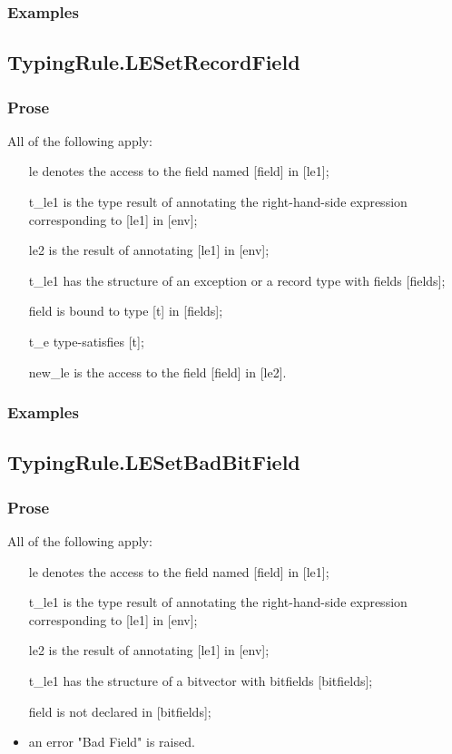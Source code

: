 \documentclass{book}
\begin{document}
    \subsubsection{Examples}

\subsection{TypingRule.LESetRecordField}

    \subsubsection{Prose}
    All of the following apply:
   \begin{itemize}
   \item [le] denotes the access to the field named [field] in [le1];
   \item [t\_le1] is the type result of annotating the right-hand-side expression corresponding to [le1] in [env];
   \item [le2] is the result of annotating [le1] in [env];
   \item [t\_le1] has the structure of an exception or a record type with fields [fields];
   \item [field] is bound to type [t] in [fields];
   \item [t\_e] type-satisfies [t]; 
   \item [new\_le] is the access to the field [field] in [le2].
   \end{itemize}

    \subsubsection{Examples}

\subsection{TypingRule.LESetBadBitField}

    \subsubsection{Prose}
    All of the following apply:
   \begin{itemize}
   \item [le] denotes the access to the field named [field] in [le1];
   \item [t\_le1] is the type result of annotating the right-hand-side expression corresponding to [le1] in [env];
   \item [le2] is the result of annotating [le1] in [env];
   \item [t\_le1] has the structure of a bitvector with bitfields [bitfields];
   \item [field] is not declared in [bitfields];
   \item an error "Bad Field" is raised.  
   \end{itemize}
\end{document}
